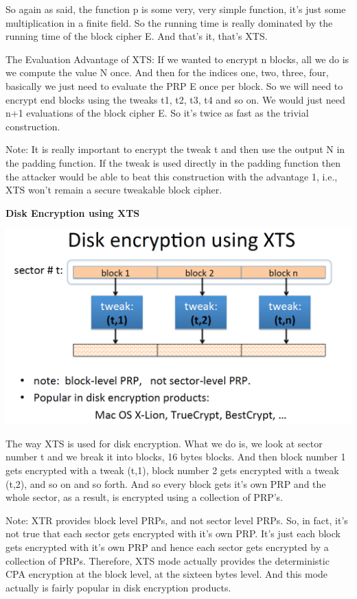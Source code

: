 \documentclass[11pt]{article}
\makeatletter
\def\maxwidth{\ifdim\Gin@nat@width>\linewidth\linewidth
    \else\Gin@nat@width\fi}
\let\Oldincludegraphics\includegraphics
\renewcommand{\includegraphics}[1]{\Oldincludegraphics[width=.8\maxwidth]{#1}}
\makeatother
\begin{document}
So again as said, the function p is some very, very simple function,
it's just some multiplication in a finite field. So the running time is
really dominated by the running time of the block cipher E. And that's
it, that's XTS.

The Evaluation Advantage of XTS: If we wanted to encrypt n blocks, all
we do is we compute the value N once. And then for the indices one, two,
three, four, basically we just need to evaluate the PRP E once per
block. So we will need to encrypt end blocks using the tweaks t1, t2,
t3, t4 and so on. We would just need n+1 evaluations of the block cipher
E. So it's twice as fast as the trivial construction.

Note: It is really important to encrypt the tweak t and then use the
output N in the padding function. If the tweak is used directly in the
padding function then the attacker would be able to beat this
construction with the advantage 1, i.e., XTS won't remain a secure
tweakable block cipher.

\textbf{Disk Encryption using XTS}

\includegraphics{./Images/DEusingXTS.png}

The way XTS is used for disk encryption. What we do is, we look at
sector number t and we break it into blocks, 16 bytes blocks. And then
block number 1 gets encrypted with a tweak (t,1), block number 2 gets
encrypted with a tweak (t,2), and so on and so forth. And so every block
gets it's own PRP and the whole sector, as a result, is encrypted using
a collection of PRP's.

Note: XTR provides block level PRPs, and not sector level PRPs. So, in
fact, it's not true that each sector gets encrypted with it's own PRP.
It's just each block gets encrypted with it's own PRP and hence each
sector gets encrypted by a collection of PRPs. Therefore, XTS mode
actually provides the deterministic CPA encryption at the block level,
at the sixteen bytes level. And this mode actually is fairly popular in
disk encryption products.
\end{document}
